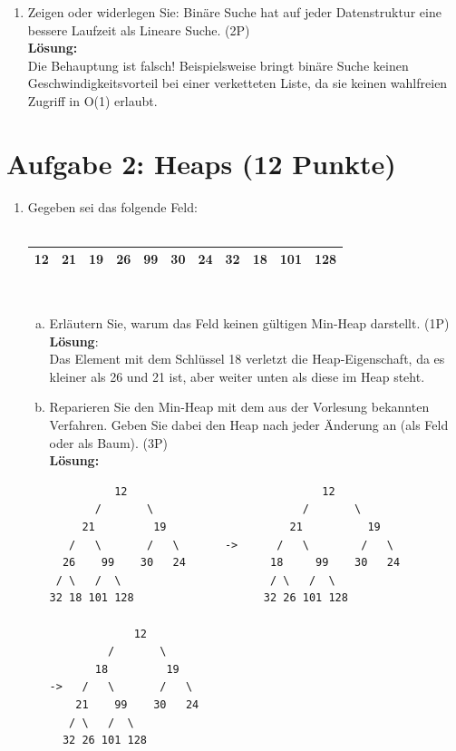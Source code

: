 \documentclass{scrartcl}
\begin{document}
\begin{enumerate}[(1)]
\item Zeigen oder widerlegen Sie: Bin\"are Suche hat auf jeder Datenstruktur eine bessere Laufzeit als Lineare Suche. (2P)\\
\textbf{Lösung:}\\
Die Behauptung ist falsch! Beispielsweise bringt binäre Suche keinen Geschwindigkeitsvorteil bei einer verketteten Liste, da sie keinen wahlfreien Zugriff in O(1) erlaubt.
\end{enumerate}

\section*{Aufgabe 2: Heaps (12 Punkte)}
\begin{enumerate}[(1)]
\item Gegeben sei das folgende Feld: \\
\ \\
\begin{tabular}{|c|c|c|c|c|c|c|c|c|c|c|}
\hline
12 & 21 & 19 & 26 & 99 & 30 & 24 & 32 & 18 & 101 & 128 \\ 
\hline 
\end{tabular} \\
\begin{enumerate}[(a)]
	\item Erläutern Sie, warum das Feld keinen gültigen Min-Heap darstellt. (1P)\\
	\textbf{Lösung}:\\
	Das Element mit dem Schlüssel 18 verletzt die Heap-Eigenschaft, da es kleiner als 26 und 21 ist, aber weiter unten als diese im Heap steht.
	
	\item Reparieren Sie den Min-Heap mit dem aus der Vorlesung bekannten Verfahren. Geben Sie dabei den Heap nach jeder Änderung an (als Feld oder als Baum). (3P)\\
\textbf{Lösung:}\\
\begin{verbatim}
          12                              12 
       /       \                       /       \
     21         19                   21          19
   /   \       /   \       ->      /   \        /   \
  26    99    30   24             18     99    30   24
 / \   /  \                       / \   /  \
32 18 101 128                    32 26 101 128

             12 
         /       \
       18         19
->   /   \       /   \
    21    99    30   24
   / \   /  \
  32 26 101 128
\end{verbatim}
\end{enumerate}


\end{enumerate}
\end{document}
